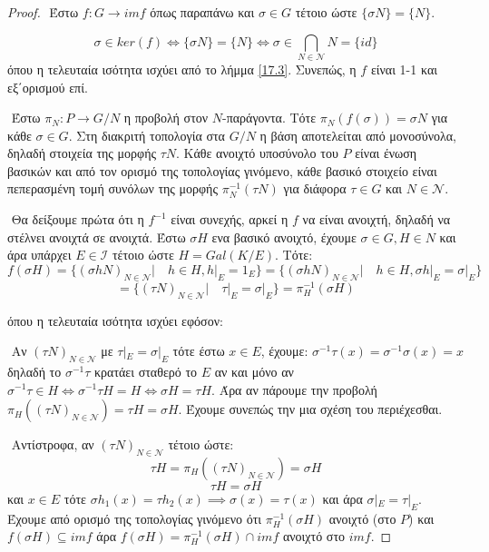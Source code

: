 \documentclass[oneside,a4paper]{article}
\begin{document}
\begin{proof}
$ $\newline
\noindent Έστω $f: G \rightarrow imf$ όπως παραπάνω και $\sigma \in G$ τέτοιο ώστε $\{\sigma N \} = \{ N\}$.

$$\sigma \in ker(f) \iff \{\sigma N\} = \{N \} \iff \sigma \in \bigcap_{N \in \mathcal{N}}N = \{id\}$$
όπου η τελευταία ισότητα ισχύει από το λήμμα \ref{17.3}. Συνεπώς, η $f$ είναι 1-1 και εξ΄ορισμού επί. 

$ $\newline
\noindent Έστω $\pi_N : P \rightarrow G/N$ η προβολή στον $N$-παράγοντα. Τότε $\pi_N (f(\sigma)) = \sigma N$ για κάθε $\sigma \in G$. Στη διακριτή τοπολογία στα $G/N$ η βάση αποτελείται από μονοσύνολα, δηλαδή στοιχεία της μορφής $\tau N$. Κάθε ανοιχτό υποσύνολο του $P$ είναι ένωση βασικών και από τον ορισμό της τοπολογίας γινόμενο, κάθε βασικό στοιχείο είναι πεπερασμένη τομή συνόλων της μορφής $\pi^{-1}_N (\tau N)$ για διάφορα $\tau \in G$ και $N \in \mathcal{N}$. 








$ $\newline
\noindent Θα δείξουμε πρώτα ότι η $f^{-1}$ είναι συνεχής, αρκεί η $f$ να είναι ανοιχτή, δηλαδή να στέλνει ανοιχτά σε ανοιχτά. Έστω $\sigma H$ ενα βασικό ανοιχτό, έχουμε $\sigma \in G , H \in N$ και άρα υπάρχει $E \in \mathcal{I}$ τέτοιο ώστε $H = Gal(K/E)$. Τότε:
$$f(\sigma H) = \{\left( \sigma h N\right)_{N \in \mathcal{N}}| \quad h \in H, h|_E = 1_E\} = \{\left( \sigma h N\right)_{N \in \mathcal{N}}| \quad h \in H, \sigma h|_E = \sigma|_E\}$$
$$= \{\left( \tau N\right)_{N \in \mathcal{N}}| \quad \tau|_E = \sigma|_E\} = \pi^{-1}_H (\sigma H)$$

όπου η τελευταία ισότητα ισχύει εφόσον:

$ $\newline 
Αν $(\tau N)_{N \in \mathcal{N}}$ με $\tau |_E = \sigma |_E$ τότε έστω $x \in E$, έχουμε: $\sigma^{-1} \tau (x) = \sigma^{-1} \sigma (x) = x$ δηλαδή το $\sigma^{-1} \tau$ κρατάει σταθερό το $E$ αν και μόνο αν $\sigma^{-1} \tau \in H \iff \sigma^{-1} \tau H = H \iff \sigma H = \tau H$. Άρα αν πάρουμε την προβολή $\pi_H \left( \left(\tau N \right)_{N \in \mathcal{N}}\right) = \tau H = \sigma H$. Έχουμε συνεπώς την μια σχέση του περιέχεσθαι.

$ $\newline
\noindent Αντίστροφα, αν $(\tau N)_{N \in \mathcal{N}}$ τέτοιο ώστε:
$$\tau H = \pi_H \left( \left(\tau N \right)_{N \in \mathcal{N}}\right) = \sigma H$$
$$\tau H = \sigma H$$
και $x \in E$ τότε $\sigma h_1 (x) = \tau h_2 (x) \implies \sigma (x) = \tau (x)$ και άρα $\sigma|_E = \tau|_E$.
Έχουμε από ορισμό της τοπολογίας γινόμενο ότι $\pi^{-1}_H (\sigma H)$ ανοιχτό (στο $P$) και $f(\sigma H) \subseteq imf$ άρα $f(\sigma H) = \pi^{-1}_H (\sigma H) \cap imf$ ανοιχτό στο $imf$.


\end{proof}
\end{document}
